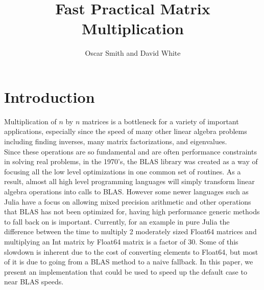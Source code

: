 \documentclass{article}         %
\title{Fast Practical Matrix Multiplication}
\author{Oscar Smith and David White }
\begin{document}
\maketitle{}
\section*{Introduction}
Multiplication of $n$ by $n$ matrices is a bottleneck for a variety of important applications, especially since the speed of many other linear algebra problems including finding inverses, many matrix factorizations, and eigenvalues.\\
Since these operations are so fundamental and are often performance constraints in solving real problems, in the 1970's, the BLAS library was created as a way of focusing all the low level optimizations in one common set of routines. As a result, almost all high level programming languages will simply transform linear algebra operations into calls to BLAS. However some newer languages such as Julia have a focus on allowing mixed precision arithmetic and other operations that BLAS has not been optimized for, having high performance generic methods to fall back on is important. Currently, for an example in pure Julia the difference between the time to multiply 2 moderately sized Float64 matrices and multiplying an Int matrix by Float64 matrix is a factor of 30. Some of this slowdown is inherent due to the cost of converting elements to Float64, but most of it is due to going from a BLAS method to a naive fallback. In this paper, we present an implementation that could be used to speed up the default case to near BLAS speeds.
\end{document}
